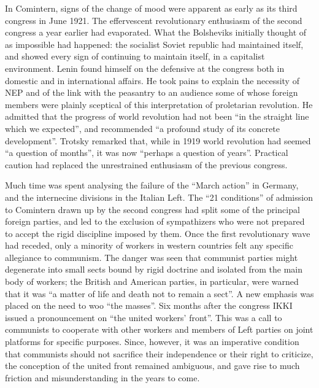 In Comintern, signs of the change of mood were apparent as early as its third congress in June 1921. The effervescent revolutionary enthusiasm of the second congress a year earlier had evaporated. What the Bolsheviks initially thought of as impossible had happened: the socialist Soviet republic had maintained itself, and showed every sign of continuing to maintain itself, in a capitalist environment. Lenin found himself on the defensive at the congress both in domestic and in international affairs. He took pains to explain the necessity of NEP and of the link with the peasantry to an audience some of whose foreign members were plainly sceptical of this interpretation of proletarian revolution. He admitted that the progress of world revolution had not been ``in the straight line which we expected'', and recommended ``a profound study of its concrete development''. Trotsky remarked that, while in 1919 world revolution had seemed ``a question of months'', it was now ``perhaps a question of years''. Practical caution had replaced the unrestrained enthusiasm of the previous congress. 

Much time was spent analysing the failure of the ``March action'' in Germany, and the internecine divisions in the Italian Left. The ``21 conditions'' of admission to Comintern drawn up by the second congress had split some of the principal foreign parties, and led to the exclusion of sympathizers who were not prepared to accept the rigid discipline imposed by them. Once the first revolutionary wave had receded, only a minority of workers in western countries felt any specific allegiance to communism. The danger was seen that communist parties might degenerate into small sects bound by rigid doctrine and isolated from the main body of workers; the British and American parties, in particular, were warned that it was ``a matter of life and death not to remain a sect''. A new emphasis was placed on the need to woo ``the masses''. Six months after the congress IKKI issued a pronouncement on ``the united workers' front''. This was a call to communists to cooperate with other workers and members of Left parties on joint platforms for specific purposes. Since, however, it was an imperative condition that communists should not sacrifice their independence or their right to criticize, the conception of the united front remained ambiguous, and gave rise to much friction and misunderstanding in the years to come. 

